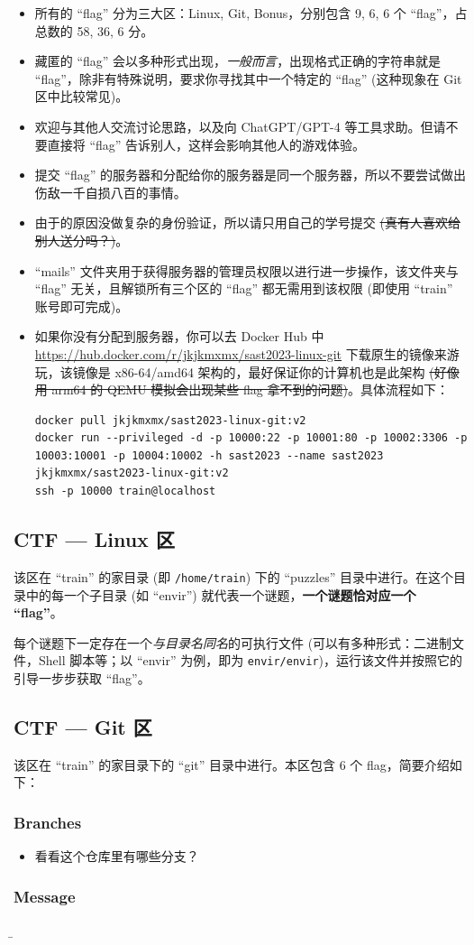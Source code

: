 \documentclass{article}
\begin{document}
	\begin{itemize}
		\itemsep0pt
		\item 所有的 ``flag'' 分为三大区：Linux, Git, Bonus，分别包含 9, 6, 6 个 ``flag''，占总数的 58, 36, 6 分。
		\item 藏匿的 ``flag'' 会以多种形式出现，\textit{一般而言}，出现格式正确的字符串就是 ``flag''，除非有特殊说明，要求你寻找其中一个特定的 ``flag'' (这种现象在 Git 区中比较常见)。
		\item 欢迎与其他人交流讨论思路，以及向 ChatGPT/GPT-4 等工具求助。但请不要直接将 ``flag'' 告诉别人，这样会影响其他人的游戏体验。
		\item 提交 ``flag'' 的服务器和分配给你的服务器是同一个服务器，所以不要尝试做出伤敌一千自损八百的事情。
		\item 由于的原因没做复杂的身份验证，所以请只用自己的学号提交 \sout{(真有人喜欢给别人送分吗？)}。
		\item ``mails'' 文件夹用于获得服务器的管理员权限以进行进一步操作，该文件夹与 ``flag'' 无关，且解锁所有三个区的 ``flag'' 都无需用到该权限 (即使用 ``train'' 账号即可完成)。
		\item 如果你没有分配到服务器，你可以去 Docker Hub 中 \url{https://hub.docker.com/r/jkjkmxmx/sast2023-linux-git} 下载原生的镜像来游玩，该镜像是 x86-64/amd64 架构的，最好保证你的计算机也是此架构 \sout{(好像用 arm64 的 QEMU 模拟会出现某些 flag 拿不到的问题)}。具体流程如下：
		\begin{verbatim}
docker pull jkjkmxmx/sast2023-linux-git:v2
docker run --privileged -d -p 10000:22 -p 10001:80 -p 10002:3306 -p 10003:10001 -p 10004:10002 -h sast2023 --name sast2023 jkjkmxmx/sast2023-linux-git:v2
ssh -p 10000 train@localhost
		\end{verbatim}
	\end{itemize}

	\subsection{CTF --- Linux 区}

	该区在 ``train'' 的家目录 (即 \texttt{/home/train}) 下的 ``puzzles'' 目录中进行。在这个目录中的每一个子目录 (如 ``envir'') 就代表一个谜题，\textbf{一个谜题恰对应一个 ``flag''}。

	每个谜题下一定存在一个\textit{与目录名同名}的可执行文件 (可以有多种形式：二进制文件，Shell 脚本等；以 ``envir'' 为例，即为 \texttt{envir/envir})，运行该文件并按照它的引导一步步获取 ``flag''。

	\subsection{CTF --- Git 区}

	该区在 ``train'' 的家目录下的 ``git'' 目录中进行。本区包含 6 个 flag，简要介绍如下：

	\subsubsection{Branches}

	\begin{itemize}
		\item 看看这个仓库里有哪些分支？
	\end{itemize}

	\subsubsection{Message}

	\b
\end{document}
